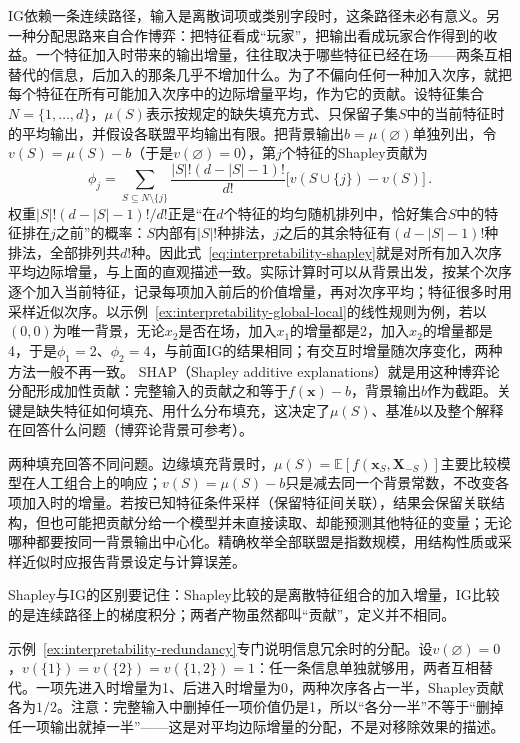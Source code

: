 IG依赖一条连续路径，输入是离散词项或类别字段时，这条路径未必有意义。另一种分配思路来自合作博弈：把特征看成“玩家”，把输出看成玩家合作得到的收益。一个特征加入时带来的输出增量，往往取决于哪些特征已经在场——两条互相替代的信息，后加入的那条几乎不增加什么。为了不偏向任何一种加入次序，就把每个特征在所有可能加入次序中的边际增量平均，作为它的贡献。设特征集合$N=\{1,\ldots,d\}$，$\mu(S)$表示按规定的缺失填充方式、只保留子集$S$中的当前特征时的平均输出，并假设各联盟平均输出有限。把背景输出$b=\mu(\varnothing)$单独列出，令$v(S)=\mu(S)-b$（于是$v(\varnothing)=0$），第$j$个特征的Shapley贡献为
\begin{equation}
 \phi_j=\sum_{S\subseteq N\setminus\{j\}}
 \frac{|S|!(d-|S|-1)!}{d!}
 \bigl[v(S\cup\{j\})-v(S)\bigr]\, .
 \label{eq:interpretability-shapley}
\end{equation}
权重$|S|!(d-|S|-1)!/d!$正是“在$d$个特征的均匀随机排列中，恰好集合$S$中的特征排在$j$之前”的概率：$S$内部有$|S|!$种排法，$j$之后的其余特征有$(d-|S|-1)!$种排法，全部排列共$d!$种。因此式~\eqref{eq:interpretability-shapley}就是对所有加入次序平均边际增量，与上面的直观描述一致。实际计算时可以从背景出发，按某个次序逐个加入当前特征，记录每项加入前后的价值增量，再对次序平均；特征很多时用采样近似次序。以示例~\ref{ex:interpretability-global-local}的线性规则为例，若以$(0,0)$为唯一背景，无论$x_2$是否在场，加入$x_1$的增量都是2，加入$x_2$的增量都是4，于是$\phi_1=2$、$\phi_2=4$，与前面IG的结果相同；有交互时增量随次序变化，两种方法一般不再一致。
SHAP（Shapley additive explanations）就是用这种博弈论分配形成加性贡献：完整输入的贡献之和等于$f(\bm x)-b$，背景输出$b$作为截距。关键是缺失特征如何填充、用什么分布填充，这决定了$\mu(S)$、基准$b$以及整个解释在回答什么问题（博弈论背景可参考）。

两种填充回答不同问题。边缘填充背景时，$\mu(S)=\mathbb E[f(\bm x_S,\bm X_{-S})]$主要比较模型在人工组合上的响应；$v(S)=\mu(S)-b$只是减去同一个背景常数，不改变各项加入时的增量。若按已知特征条件采样（保留特征间关联），结果会保留关联结构，但也可能把贡献分给一个模型并未直接读取、却能预测其他特征的变量；无论哪种都要按同一背景输出中心化。精确枚举全部联盟是指数规模，用结构性质或采样近似时应报告背景设定与计算误差。

Shapley与IG的区别要记住：Shapley比较的是离散特征组合的加入增量，IG比较的是连续路径上的梯度积分；两者产物虽然都叫“贡献”，定义并不相同。

\begin{example}[共同信息的贡献分配]
\label{ex:interpretability-redundancy}
示例~\ref{ex:interpretability-redundancy}专门说明信息冗余时的分配。设$v(\varnothing)=0$，$v(\{1\})=v(\{2\})=v(\{1,2\})=1$：任一条信息单独就够用，两者互相替代。一项先进入时增量为1、后进入时增量为0，两种次序各占一半，Shapley贡献各为$1/2$。注意：完整输入中删掉任一项价值仍是1，所以“各分一半”不等于“删掉任一项输出就掉一半”——这是对平均边际增量的分配，不是对移除效果的描述。
\end{example}

